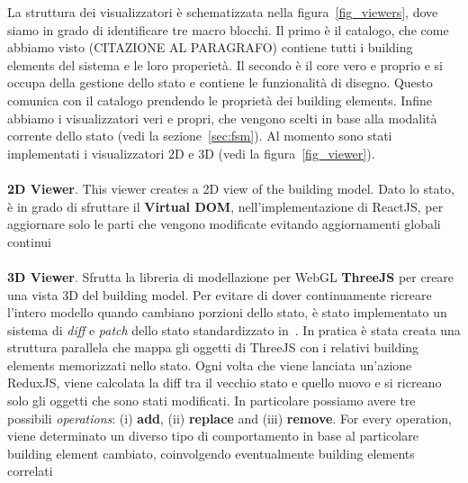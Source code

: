 La struttura dei visualizzatori \`e schematizzata nella figura~\ref{fig_viewers}, dove siamo in grado di identificare tre macro blocchi. Il primo \`e il catalogo, che come abbiamo visto (CITAZIONE AL PARAGRAFO) contiene tutti i building elements del sistema e le loro properiet\`a. Il secondo \`e il core vero e proprio e si occupa della gestione dello stato e contiene le funzionalit\`a di disegno. Questo comunica con il catalogo prendendo le propriet\`a dei building elements. Infine abbiamo i visualizzatori veri e propri, che vengono scelti in base alla modalit\`a corrente dello stato (vedi la sezione~\ref{sec:fsm}). Al momento sono stati implementati i visualizzatori 2D e 3D (vedi la figura~\ref{fig_viewer}).\\\\
\textbf{2D Viewer}. This viewer creates a 2D view of the building model. Dato lo stato, \`e in grado di sfruttare il \textbf{Virtual DOM}, nell'implementazione di ReactJS, per aggiornare solo le parti che vengono modificate evitando aggiornamenti globali continui\\\\
\textbf{3D Viewer}. Sfrutta la libreria di modellazione per WebGL \textbf{ThreeJS} per creare una vista 3D del building model. Per evitare di dover continuamente ricreare l'intero modello quando cambiano porzioni dello stato, \`e stato implementato un sistema di \textit{diff} e \textit{patch} dello stato standardizzato in~\cite{rfc6902}. In pratica \`e stata creata una struttura parallela che mappa gli oggetti di ThreeJS con i relativi building elements memorizzati nello stato. Ogni volta che viene lanciata un'azione ReduxJS, viene calcolata la diff tra il vecchio stato e quello nuovo e si ricreano solo gli oggetti che sono stati modificati. In particolare possiamo avere tre possibili \textit{operations}: (i) \textbf{add}, (ii) \textbf{replace} and (iii) \textbf{remove}. For every operation, viene determinato un diverso tipo di comportamento in base al particolare building element cambiato, coinvolgendo eventualmente building elements correlati


